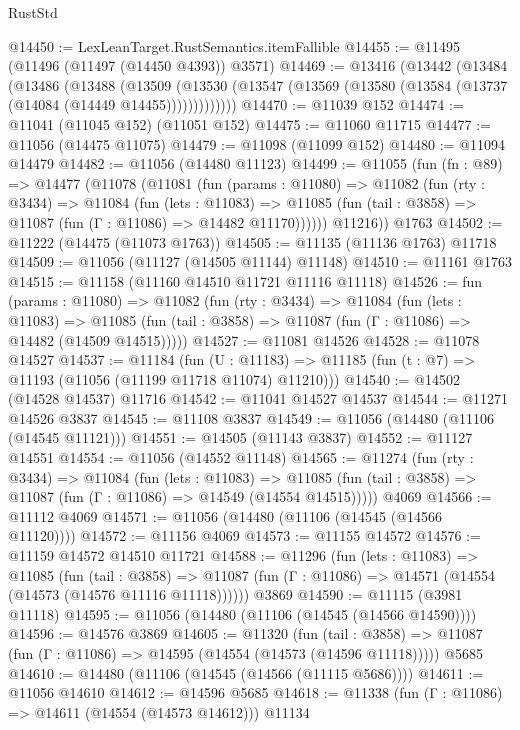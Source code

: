 \begin{lexlean}{RustStd}
\begin{coremodule}
@14450 := LexLeanTarget.RustSemantics.itemFallible
@14455 := @11495 (@11496 (@11497 (@14450 @4393)) @3571)
@14469 := @13416
    (@13442
      (@13484
        (@13486
          (@13488
            (@13509
              (@13530 (@13547 (@13569 (@13580 (@13584 (@13737 (@14084 (@14449 @14455)))))))))))))
@14470 := @11039 @152
@14474 := @11041 (@11045 @152) (@11051 @152)
@14475 := @11060 @11715
@14477 := @11056 (@14475 @11075)
@14479 := @11098 (@11099 @152)
@14480 := @11094 @14479
@14482 := @11056 (@14480 @11123)
@14499 := @11055
    (fun (fn : @89) =>
    @14477
      (@11078
        (@11081
          (fun (params : @11080) =>
          @11082
            (fun (rty : @3434) =>
            @11084
              (fun (lets : @11083) =>
              @11085 (fun (tail : @3858) => @11087 (fun (Γ : @11086) => @14482 @11170))))))
        @11216))
    @1763
@14502 := @11222 (@14475 (@11073 @1763))
@14505 := @11135 (@11136 @1763) @11718
@14509 := @11056 (@11127 (@14505 @11144) @11148)
@14510 := @11161 @1763
@14515 := @11158 (@11160 @14510 @11721 @11116 @11118)
@14526 := fun (params : @11080) =>
  @11082
    (fun (rty : @3434) =>
    @11084
      (fun (lets : @11083) =>
      @11085 (fun (tail : @3858) => @11087 (fun (Γ : @11086) => @14482 (@14509 @14515)))))
@14527 := @11081 @14526
@14528 := @11078 @14527
@14537 := @11184
    (fun (U : @11183) => @11185 (fun (t : @7) => @11193 (@11056 (@11199 @11718 @11074) @11210)))
@14540 := @14502 (@14528 @14537) @11716
@14542 := @11041 @14527 @14537
@14544 := @11271 @14526 @3837
@14545 := @11108 @3837
@14549 := @11056 (@14480 (@11106 (@14545 @11121)))
@14551 := @14505 (@11143 @3837)
@14552 := @11127 @14551
@14554 := @11056 (@14552 @11148)
@14565 := @11274
    (fun (rty : @3434) =>
    @11084
      (fun (lets : @11083) =>
      @11085 (fun (tail : @3858) => @11087 (fun (Γ : @11086) => @14549 (@14554 @14515)))))
    @4069
@14566 := @11112 @4069
@14571 := @11056 (@14480 (@11106 (@14545 (@14566 @11120))))
@14572 := @11156 @4069
@14573 := @11155 @14572
@14576 := @11159 @14572 @14510 @11721
@14588 := @11296
    (fun (lets : @11083) =>
    @11085
      (fun (tail : @3858) =>
      @11087 (fun (Γ : @11086) => @14571 (@14554 (@14573 (@14576 @11116 @11118))))))
    @3869
@14590 := @11115 (@3981 @11118)
@14595 := @11056 (@14480 (@11106 (@14545 (@14566 @14590))))
@14596 := @14576 @3869
@14605 := @11320
    (fun (tail : @3858) => @11087 (fun (Γ : @11086) => @14595 (@14554 (@14573 (@14596 @11118)))))
    @5685
@14610 := @14480 (@11106 (@14545 (@14566 (@11115 @5686))))
@14611 := @11056 @14610
@14612 := @14596 @5685
@14618 := @11338 (fun (Γ : @11086) => @14611 (@14554 (@14573 @14612))) @11134

\end{coremodule}
\end{lexlean}
